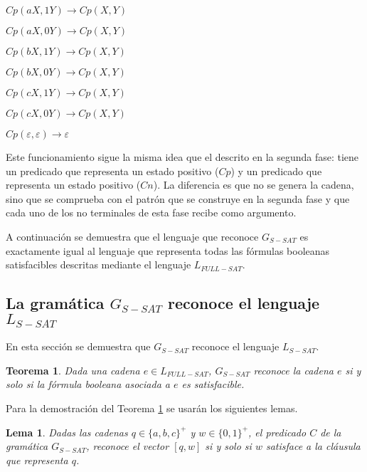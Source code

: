 \documentclass{article}
\newtheorem{theorem}{Teorema}
\newtheorem{lemma}{Lema}
\begin{document}
\begin{itemize}
\begin{enumerate}[start=23]
\begin{multicols}{2}
                  \item $Cp(aX,1Y) \to Cp(X,Y)$
                  \item $Cp(aX,0Y) \to Cp(X,Y)$
                  \item $Cp(bX,1Y) \to Cp(X,Y)$
                  \item $Cp(bX,0Y) \to Cp(X,Y)$
                  \item $Cp(cX,1Y) \to Cp(X,Y)$
                  \item $Cp(cX,0Y) \to Cp(X,Y)$
                  \item $Cp(\varepsilon,\varepsilon)\to \varepsilon$
              \end{multicols}
          \end{enumerate}

          Este funcionamiento sigue la misma idea que el descrito en la segunda fase: tiene un predicado que representa un estado positivo ($Cp$) y un predicado que representa un estado positivo ($Cn$). La diferencia es que no se genera la cadena, sino que se comprueba con el patrón que se construye en la segunda fase y que cada uno de los no terminales de esta fase recibe como argumento.
\end{itemize}

A continuación se demuestra que el lenguaje que reconoce $G_{S-SAT}$ es exactamente igual al lenguaje que representa todas las fórmulas booleanas satisfacibles descritas mediante el lenguaje $L_{FULL-SAT}$.

\subsection{La gramática $G_{S-SAT}$ reconoce el lenguaje $L_{S-SAT}$}

En esta sección se demuestra que $G_{S-SAT}$ reconoce el lenguaje $L_{S-SAT}$.
\begin{theorem}
    \label{teo:gsat}
    Dada una cadena $e\in L_{FULL-SAT}$, $G_{S-SAT}$ reconoce la cadena $e$ si y solo si la fórmula booleana asociada a $e$ es satisfacible.
\end{theorem}

Para la demostración del Teorema \ref{teo:gsat} se usarán los siguientes lemas.

\begin{lemma}
    \label{lem:predc}
    Dadas las cadenas $q\in \{a,b,c\}^+$ y $w\in \{0,1\}^+$, el predicado $C$ de la gramática $G_{S-SAT}$, reconoce el vector $[q,w]$ si y solo si $w$ satisface a la cláusula que representa $q$.
\end{lemma}
\end{document}
